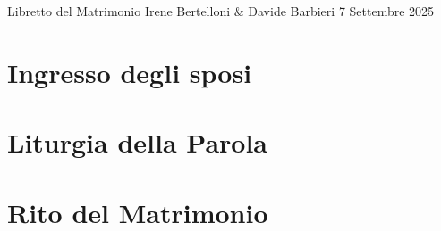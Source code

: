 \documentclass[12pt, a4paper]{article}
\renewcommand{\maketitle}{%
  \begin{center}
    {\brittany\Huge Libretto del Matrimonio}
    \vspace{1cm}
    {\brittany\LARGE Irene Bertelloni \& Davide Barbieri}
    \vspace{0.5cm}
    {\brittany\Large 7 Settembre 2025}
  \end{center}
  \thispagestyle{empty}
}
\begin{document}
\maketitle

\section*{Ingresso degli sposi}


\section*{Liturgia della Parola}


\section*{Rito del Matrimonio}

\end{document}
